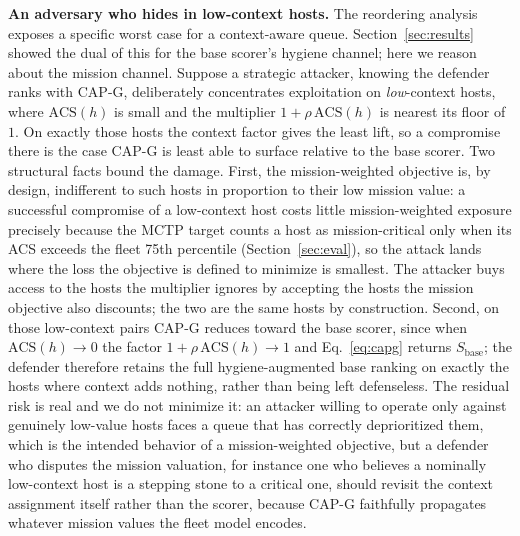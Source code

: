 \textbf{An adversary who hides in low-context hosts.} The reordering analysis
exposes a specific worst case for a context-aware queue. Section~\ref{sec:results}
showed the dual of this for the base scorer's hygiene channel; here we reason about
the mission channel. Suppose a strategic attacker, knowing the defender ranks with
CAP-G, deliberately concentrates exploitation on \emph{low}-context hosts, where
$\mathrm{ACS}(h)$ is small and the multiplier $1+\rho\,\mathrm{ACS}(h)$ is nearest
its floor of $1$. On exactly those hosts the context factor gives the least lift,
so a compromise there is the case CAP-G is least able to surface relative to the
base scorer. Two structural facts bound the damage. First, the mission-weighted
objective is, by design, indifferent to such hosts in proportion to their low
mission value: a successful compromise of a low-context host costs little
mission-weighted exposure precisely because the MCTP target counts a host as
mission-critical only when its ACS exceeds the fleet 75th percentile
(Section~\ref{sec:eval}), so the attack lands where the loss the objective is
defined to minimize is smallest. The attacker buys access to the hosts the
multiplier ignores by accepting the hosts the mission objective also discounts;
the two are the same hosts by construction. Second, on those low-context pairs CAP-G
reduces toward the base scorer, since when $\mathrm{ACS}(h)\!\to\!0$ the factor
$1+\rho\,\mathrm{ACS}(h)\!\to\!1$ and Eq.~\ref{eq:capg} returns
$S_{\mathrm{base}}$; the defender therefore retains the full hygiene-augmented base
ranking on exactly the hosts where context adds nothing, rather than being left
defenseless. The residual risk is real and we do not minimize it: an attacker
willing to operate only against genuinely low-value hosts faces a queue that has
correctly deprioritized them, which is the intended behavior of a mission-weighted
objective, but a defender who disputes the mission valuation, for instance one who
believes a nominally low-context host is a stepping stone to a critical one, should
revisit the context assignment itself rather than the scorer, because CAP-G faithfully
propagates whatever mission values the fleet model encodes.

